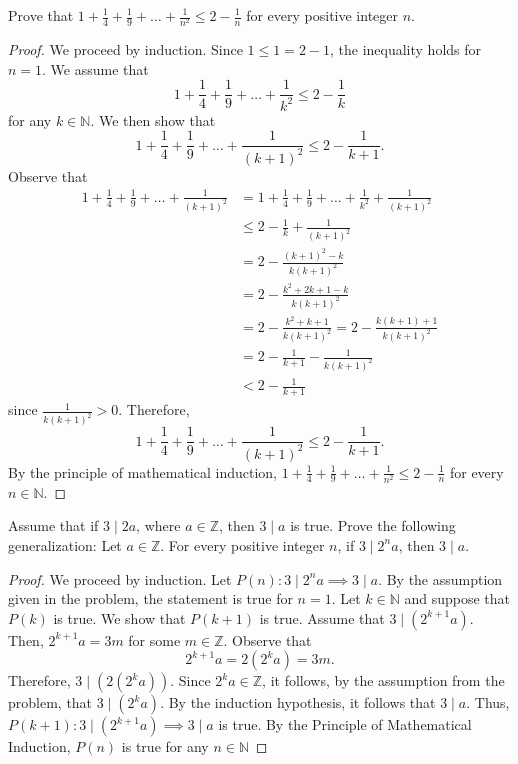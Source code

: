 \documentclass[12pt]{article}
\newcommand{\N}{\mathbb{N}}
\newcommand{\Z}{\mathbb{Z}}
\newenvironment{problem}[2][Problem]{\begin{trivlist}
		\item[\hskip \labelsep {\bfseries #1}\hskip \labelsep {\bfseries #2.}]}{\end{trivlist}}
\begin{document}
\begin{problem}{27}
	Prove that $1+\frac{1}{4}+\frac{1}{9}+\ldots + \frac{1}{n^{2}}\leq 2-\frac{1}{n}$ for every positive integer $n$.
	\begin{proof}
		We proceed by induction. Since $1\leq 1 = 2-1$, the inequality holds for $n=1$. We assume that
		\begin{equation*}
		 1+\frac{1}{4}+\frac{1}{9}+\ldots + \frac{1}{k^{2}}\leq 2-\frac{1}{k}
	 \end{equation*}
 		for any $k\in \N$. We then show that 
 		\begin{equation*}
 			1+\frac{1}{4}+\frac{1}{9}+\ldots + \frac{1}{(k+1)^{2}}\leq 2-\frac{1}{k+1}.
 		\end{equation*}
 		Observe that
 		\begin{align*}
 			1+\frac{1}{4}+\frac{1}{9}+\ldots + \frac{1}{(k+1)^{2}} &= 1+\frac{1}{4}+\frac{1}{9}+\ldots + \frac{1}{k^{2}} +\frac{1}{(k+1)^{2}}\\
 			&\leq 2-\frac{1}{k} +\frac{1}{(k+1)^{2}}\\
 			&= 2- \frac{(k+1)^{2}-k}{k(k+1)^{2}}\\
 			&= 2-\frac{k^{2}+2k+1-k}{k(k+1)^{2}}\\
 			&= 2-\frac{k^{2}+k+1}{k(k+1)^{2}} = 2-\frac{k(k+1)+1}{k(k+1)^{2}}\\
 			&= 2-\frac{1}{k+1}-\frac{1}{k(k+1)^{2}}\\
 			&< 2-\frac{1}{k+1}
 		\end{align*}
 	since $\frac{1}{k(k+1)^{2}}>0$. Therefore,
 	\begin{equation*}
 		1+\frac{1}{4}+\frac{1}{9}+\ldots + \frac{1}{(k+1)^{2}} \leq 2-\frac{1}{k+1}.
 	\end{equation*}
 By the principle of mathematical induction, $1+\frac{1}{4}+\frac{1}{9}+\ldots + \frac{1}{n^{2}}\leq 2-\frac{1}{n}$ for every  $n\in \N$.
	\end{proof}
\end{problem}

\begin{problem}{28}
	Assume that if $3\mid 2a$, where $a\in \Z$, then $3\mid a$ is true. Prove the following generalization: Let $a\in \Z$. For every positive integer $n$, if $3\mid 2^{n}a$, then $3\mid a$.
	\begin{proof}
		We proceed by induction. Let $P(n):3\mid 2^{n}a\implies 3\mid a$. By the assumption given in the problem, the statement is true for $n=1$. Let $k\in \N$ and suppose that $P(k)$ is true. We show that $P(k+1)$ is true. Assume that $3\mid (2^{k+1}a)$. Then, $2^{k+1}a = 3m$ for some $m\in \Z$. Observe that
		\begin{equation*}
			2^{k+1}a = 2(2^{k}a) = 3m.
		\end{equation*}
		Therefore, $3 \mid (2(2^{k}a))$. Since $2^{k}a\in \Z$, it follows, by the assumption from the problem, that $3\mid (2^{k}a)$. By the induction hypothesis, it follows that $3\mid a$. Thus, $P(k+1):3\mid (2^{k+1}a)\implies 3\mid a$ is true.
	By the Principle of Mathematical Induction, $P(n)$ is true for any $n\in \N$
	\end{proof}
\end{problem}
\end{document}
